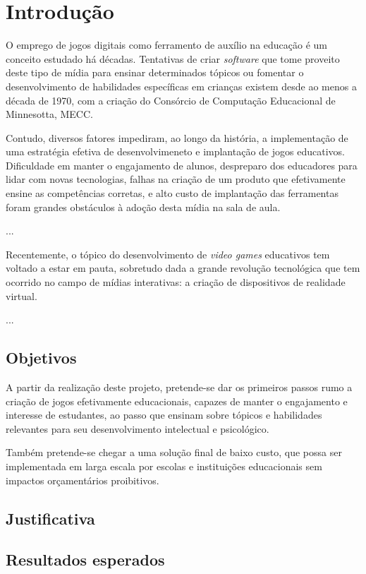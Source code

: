 \chapter{Introdução}

O emprego de jogos digitais como ferramento de auxílio na educação é um conceito estudado há décadas. Tentativas de criar \textit{software} que tome proveito deste tipo de mídia para ensinar determinados tópicos ou fomentar o desenvolvimento de habilidades específicas em crianças existem desde ao menos a década de 1970, com a criação do Consórcio de Computação Educacional de Minnesotta, MECC.

Contudo, diversos fatores impediram, ao longo da história, a implementação de uma estratégia efetiva de desenvolvimeneto e implantação de jogos educativos. Dificuldade em manter o engajamento de alunos, despreparo dos educadores para lidar com novas tecnologias, falhas na criação de um produto que efetivamente ensine as competências corretas, e alto custo de implantação das ferramentas foram grandes obstáculos à adoção desta mídia na sala de aula. 

...

Recentemente, o tópico do desenvolvimento de \textit{video games} educativos tem voltado a estar em pauta, sobretudo dada a grande revolução tecnológica que tem ocorrido no campo de mídias interativas: a criação de dispositivos de realidade virtual.

...

\section{Objetivos}\label{sec-objetivos}

A partir da realização deste projeto, pretende-se dar os primeiros passos rumo a criação de jogos efetivamente educacionais, capazes de manter o engajamento e interesse de estudantes, ao passo que ensinam sobre tópicos e habilidades relevantes para seu desenvolvimento intelectual e psicológico.

Também pretende-se chegar a uma solução final de baixo custo, que possa ser implementada em larga escala por escolas e instituições educacionais sem impactos orçamentários proibitivos.



\section{Justificativa}\label{sec-justificativas}


\section{Resultados esperados}\label{sec-resultados-esperados}

